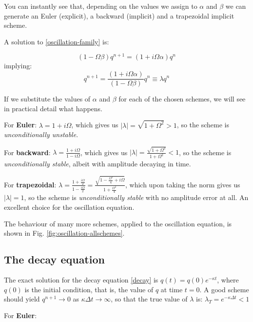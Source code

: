 You can instantly see that, depending on the values we assign to $\alpha$ and $\beta$ we can generate an Euler (explicit), a backward (implicit) and a trapezoidal implicit scheme.

A solution to \ref{oscillation-family} is:

\begin{equation}
	(1-\Omega\beta)q^{n+1} = (1+i\Omega\alpha) q^n 
	\label{oscillation-family-solution}
\end{equation}
implying:
\begin{equation}
	q^{n+1} = \frac{(1+i\Omega\alpha)}{(1-\Omega\beta)} q^n \equiv \lambda q^n
	\label{oscillation-family-solution}
\end{equation}

If we substitute the values of $\alpha$ and $\beta$ for each of the chosen schemes, we will see in practical detail what happens.

For {\bf Euler}: $\lambda = 1 + i \Omega$, which gives us $|\lambda|=\sqrt{1+\Omega^2}>1$, so the scheme is \emph{unconditionally unstable}.

 For {\bf backward}: $\lambda = \frac{1 + i \Omega}{1 - i \Omega}$, which gives us $|\lambda|=\frac{\sqrt{1+\Omega^2}}{1+\Omega^2}<1$, so the scheme is \emph{unconditionally stable}, albeit with amplitude decaying in time.

 For {\bf trapezoidal}: $\lambda = \frac{1 + \frac{i \Omega}{2}}{1 - \frac{i \Omega}{2}} = \frac{\sqrt{1-\frac{\Omega^2}{4}+i\Omega}}{1+\frac{\Omega^2}{4}}$, which upon taking the norm gives us $|\lambda|=1$, so the scheme is \emph{unconditionally stable} with no amplitude error at all. An excellent choice for the oscillation equation.

The behaviour of many more schemes, applied to the oscillation equation, is shown in Fig. \ref{fig:oscillation-allschemes}.

\subsection{The decay equation}

The exact solution for the decay equation \ref{decay} is $q(t) = q(0) e^{- \kappa t}$, where $q(0)$ is the initial condition, that is, the value of $q$ at time $t=0$. A good scheme should yield $q^{n+1} \rightarrow 0$ as $\kappa \Delta t \rightarrow \infty$, so that the true value of $\lambda$ is: $\lambda_T=e^{- \kappa \Delta t} < 1 $

For {\bf Euler}: 


